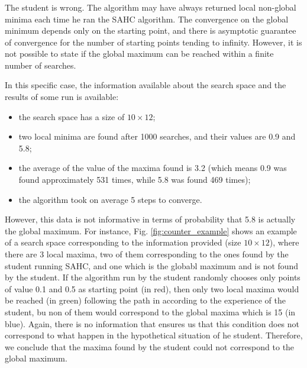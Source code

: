 \subsubsection{}
The student is wrong. The algorithm may have always returned local non-global minima each time he ran the SAHC algorithm. The convergence on the global minimum depends only on the starting point, and there is asymptotic guarantee of convergence for the number of starting points tending to infinity. However, it is not possible to state if the global maximum can be reached within a finite number of searches.

In this specific case, the information available about the search space and the results of some run is available:
\begin{itemize}
    \item the search space has a size of $10\times 12$;
    \item two local minima are found after 1000 searches, and their values are 0.9 and 5.8;
    \item the average of the value of the maxima found is 3.2 (which means 0.9 was found approximately 531 times, while 5.8 was found 469 times);
    \item the algorithm took on average 5 steps to converge.
\end{itemize}

However, this data is not informative in terms of probability that 5.8 is actually the global maximum. For instance, Fig. \ref{fig:counter_example} shows an example of a search space corresponding to the information provided (size $10\times 12$), where there are 3 local maxima, two of them corresponding to the ones found by the student running SAHC, and one which is the globabl maximum and is not found by the student. If the algorithm run by the student randomly chooses only points of value 0.1 and 0.5 as starting point (in red), then only two local maxima would be reached (in green) following the path in  according to the experience of the student, bu non of them would correspond to the global maxima which is 15 (in blue). Again, there is no information that ensures us that this condition does not correspond to what happen in the hypothetical situation of he student. Therefore, we conclude that the maxima found by the student could not correspond to the global maximum.


